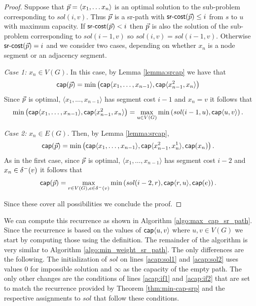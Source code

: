\begin{proof}
Suppose that $\vec{p} = \langle x_1, \ldots x_n \rangle$ is an optimal solution to the sub-problem corresponding to $\mathit{sol}(i, v)$.
Thus $\vec{p}$ is a sr-path with $\textsf{sr-cost}(\vec{p}) \leq i$ from $s$ to $u$ with maximum capacity. If $\textsf{sr-cost}(\vec{p}) < i$
then $\vec{p}$ is also the solution of the sub-problem corresponding to $\mathit{sol}(i - 1, v)$ so $\mathit{sol}(i, v) = \mathit{sol}(i - 1, v)$.
Otherwise $\textsf{sr-cost}(\vec{p}) = i$ and we consider two cases, depending on whether $x_n$ is a node segment or an adjacency segment.

\emph{Case 1: $x_n \in V(G)$}. In this case, by Lemma \ref{lemma:srcap} we have that
\begin{align*}
\mathsf{cap}(\vec{p}) = \min \left( \mathsf{cap} \langle x_1, \ldots, x_{n - 1} \rangle, \mathsf{cap} \langle x^2_{n - 1}, x_n \rangle \right) 
\end{align*}
Since $\vec{p}$ is optimal, $\langle x_1, \ldots, x_{n - 1} \rangle$ has segment cost $i - 1$ and $x_n = v$ it follows that
$$
\min \left( \mathsf{cap} \langle x_1, \ldots, x_{n - 1} \rangle, \mathsf{cap} \langle x^2_{n - 1}, x_n \rangle \right) = \max_{u \in V(G)} \min \left( \mathit{sol}(i - 1, u), \mathsf{cap} \langle u, v \rangle \right).
$$

\emph{Case 2: $x_n \in E(G)$}. Then, by Lemma \ref{lemma:srcap},
\begin{align*}
\mathsf{cap}(\vec{p}) = \min \left( \mathsf{cap} \langle x_1, \ldots, x_{n - 1} \rangle, \mathsf{cap} \langle x^2_{n - 1}, x^1_n \rangle, \mathsf{cap}(x_n) \right).
\end{align*}
As in the first case, since $\vec{p}$ is optimal, $\langle x_1, \ldots, x_{n - 1} \rangle$ has segment cost $i - 2$ and $x_n \in \delta^-(v)$ it follows that
$$
\mathsf{cap}(\vec{p}) = \max_{r \in V(G), e \in \delta^-(v)} \min \left( \mathit{sol}(i - 2, r), \mathsf{cap} \langle r, u \rangle, \mathsf{cap}(e) \right).
$$

Since these cover all possibilities we conclude the proof.
\end{proof}

We can compute this recurrence as shown in Algorithm \ref{algo:max_cap_sr_path}. Since the recurrence is based on the values
of $\mathsf{cap} \langle u, v \rangle$ where $u, v \in V(G)$ we start by computing those using the definition. The remainder of the
algorithm is very similar to Algorithm \ref{algo:min_weight_sr_path}. The only differences are the following. The initialization of $sol$
on lines \ref{acap:sol1} and \ref{acap:sol2} uses values $0$ for impossible solution and $\infty$ as the capacity of the empty path.
The only other changes are the conditions of lines \ref{acap:if1} and \ref{acap:if2} that are set to match the recurrence
provided by Theorem \ref{thm:min-cap-srp} and the respective assignments to $sol$ that follow these conditions.

